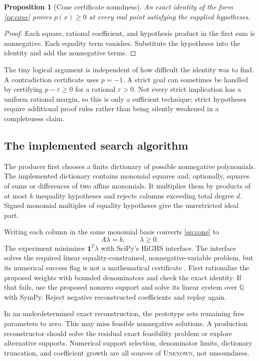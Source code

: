 \documentclass[11pt,a4paper]{article}
\newcommand{\Q}{\mathbb Q}\newcommand{\R}{\mathbb R}\newcommand{\N}{\mathbb N}
\newcommand{\unknown}{\textsc{Unknown}}
\newtheorem{proposition}{Proposition}[section]
\begin{document}
\begin{proposition}[Cone certificate soundness]
An exact identity of the form \eqref{eq:cone} proves $p(x)\ge0$ at every real point satisfying the supplied hypotheses.
\end{proposition}
\begin{proof}
Each square, rational coefficient, and hypothesis product in the first sum is nonnegative. Each equality term vanishes. Substitute the hypotheses into the identity and add the nonnegative terms.
\end{proof}

The tiny logical argument is independent of how difficult the identity was to find. A contradiction certificate uses $p=-1$. A strict goal can sometimes be handled by certifying $p-\varepsilon\ge0$ for a rational $\varepsilon>0$. Not every strict implication has a uniform rational margin, so this is only a sufficient technique; strict hypotheses require additional proof rules rather than being silently weakened in a completeness claim.

\subsection{The implemented search algorithm}
The producer first chooses a finite dictionary of possible nonnegative polynomials. The implemented dictionary contains monomial squares and, optionally, squares of sums or differences of two affine monomials. It multiplies them by products of at most $k$ inequality hypotheses and rejects columns exceeding total degree $d$. Signed monomial multiples of equality hypotheses give the unrestricted ideal part.

Writing each column in the same monomial basis converts \eqref{eq:cone} to
\[
 A\lambda=b,\qquad\lambda\ge0.
\]
The experiment minimizes $\mathbf1^T\lambda$ with SciPy's HiGHS interface. The interface solves the required linear equality-constrained, nonnegative-variable problem, but its numerical success flag is not a mathematical certificate \cite{scipyhighs}. First rationalize the proposed weights with bounded denominators and check the exact identity. If that fails, use the proposed nonzero support and solve its linear system over $\Q$ with SymPy. Reject negative reconstructed coefficients and replay again.

In an underdetermined exact reconstruction, the prototype sets remaining free parameters to zero. This may miss feasible nonnegative solutions. A production reconstructor should solve the residual exact feasibility problem or explore alternative supports. Numerical support selection, denominator limits, dictionary truncation, and coefficient growth are all sources of \unknown{}, not unsoundness.
\end{document}
